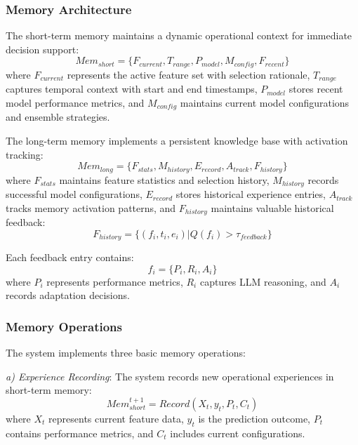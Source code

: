 \documentclass[conference]{IEEEtran}
\begin{document}
\subsubsection{Memory Architecture}
The short-term memory maintains a dynamic operational context for immediate decision support:
\begin{equation}
    Mem_{short} = \{F_{current}, T_{range}, P_{model}, M_{config}, F_{recent}\}
\end{equation}
where $F_{current}$ represents the active feature set with selection rationale, $T_{range}$ captures temporal context with start and end timestamps, $P_{model}$ stores recent model performance metrics, and $M_{config}$ maintains current model configurations and ensemble strategies.

The long-term memory implements a persistent knowledge base with activation tracking:
\begin{equation}
    Mem_{long} = \{F_{stats}, M_{history}, E_{record}, A_{track}, F_{history}\}
\end{equation}
where $F_{stats}$ maintains feature statistics and selection history, $M_{history}$ records successful model configurations, $E_{record}$ stores historical experience entries, $A_{track}$ tracks memory activation patterns, and $F_{history}$ maintains valuable historical feedback:
\begin{equation}
    F_{history} = \{(f_i, t_i, e_i) | Q(f_i) > \tau_{feedback}\}
\end{equation}

Each feedback entry contains:
\begin{equation}
    f_i = \{P_i, R_i, A_i\}
\end{equation}
where $P_i$ represents performance metrics, $R_i$ captures LLM reasoning, and $A_i$ records adaptation decisions.

\subsubsection{Memory Operations}
The system implements three basic memory operations:

\textit{a) Experience Recording}: The system records new operational experiences in short-term memory:
\begin{equation}
    Mem_{short}^{t+1} = Record(X_t, y_t, P_t, C_t)
\end{equation}
where $X_t$ represents current feature data, $y_t$ is the prediction outcome, $P_t$ contains performance metrics, and $C_t$ includes current configurations.
\end{document}
